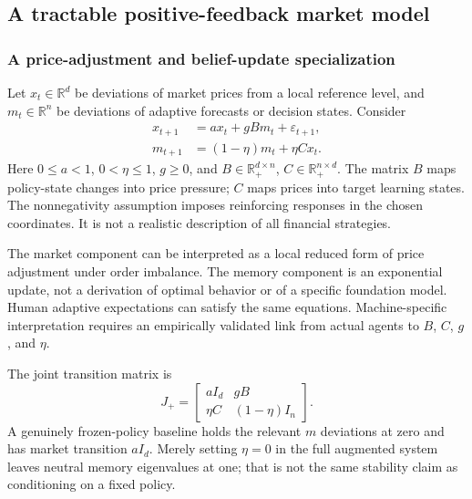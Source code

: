 \documentclass[10pt,twocolumn,letterpaper]{article}
\theoremstyle{definition}
\theoremstyle{remark}
\newcommand{\R}{\mathbb{R}}
\begin{document}
\subsection{A tractable positive-feedback market model}
\label{sec:positive}
\label{sec:tractable}
\subsubsection{A price-adjustment and belief-update specialization}
Let $x_t\in\R^d$ be deviations of market prices from a local reference level, and $m_t\in\R^n$ be deviations of adaptive forecasts or decision states. Consider
\begin{align}
 x_{t+1}&=a x_t+gB m_t+\varepsilon_{t+1},\label{eq:positiveprice}\\
 m_{t+1}&=(1-\eta)m_t+\eta C x_t.\label{eq:positivememory}
\end{align}
Here $0\leq a<1$, $0<\eta\leq1$, $g\geq0$, and $B\in\R_+^{d\times n}$, $C\in\R_+^{n\times d}$. The matrix $B$ maps policy-state changes into price pressure; $C$ maps prices into target learning states. The nonnegativity assumption imposes reinforcing responses in the chosen coordinates. It is not a realistic description of all financial strategies.

The market component can be interpreted as a local reduced form of price adjustment under order imbalance. The memory component is an exponential update, not a derivation of optimal behavior or of a specific foundation model. Human adaptive expectations can satisfy the same equations. Machine-specific interpretation requires an empirically validated link from actual agents to $B$, $C$, $g$, and $\eta$.

The joint transition matrix is
\begin{equation}
 J_+=\begin{bmatrix}aI_d&gB\\\eta C&(1-\eta)I_n\end{bmatrix}.
 \label{eq:Jpositive}
\end{equation}
A genuinely frozen-policy baseline holds the relevant $m$ deviations at zero and has market transition $aI_d$. Merely setting $\eta=0$ in the full augmented system leaves neutral memory eigenvalues at one; that is not the same stability claim as conditioning on a fixed policy.
\end{document}
